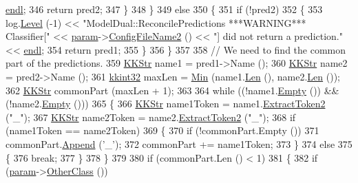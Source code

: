 \begin{DoxyCode}
      \hyperlink{namespace_k_k_b_ad1f50f65af6adc8fa9e6f62d007818a8}{endl};
346       \textcolor{keywordflow}{return} pred2;
347     \}
348   \}
349   \textcolor{keywordflow}{else}
350   \{
351     \textcolor{keywordflow}{if}  (!pred2)
352     \{
353       log.\hyperlink{class_k_k_b_1_1_run_log_a32cf761d7f2e747465fd80533fdbb659}{Level} (-1) << \textcolor{stringliteral}{"ModelDual::ReconcilePredictions  ***WARNING***  Classifier["} << 
      \hyperlink{class_k_k_m_l_l_1_1_model_dual_ac78b32cfbe102267574423e84aba9e42}{param}->\hyperlink{class_k_k_m_l_l_1_1_model_param_dual_ab8f04150ca014f0d8244b0f01a10503a}{ConfigFileName2} () << \textcolor{stringliteral}{"] did not return a prediction."} << 
      \hyperlink{namespace_k_k_b_ad1f50f65af6adc8fa9e6f62d007818a8}{endl};
354       \textcolor{keywordflow}{return}  pred1;
355     \}
356   \}
357 
358   \textcolor{comment}{// We need to find the common part of the predictions.}
359   \hyperlink{class_k_k_b_1_1_k_k_str}{KKStr}  name1 = pred1->Name ();
360   \hyperlink{class_k_k_b_1_1_k_k_str}{KKStr}  name2 = pred2->Name ();
361   \hyperlink{namespace_k_k_b_a8fa4952cc84fda1de4bec1fbdd8d5b1b}{kkint32} maxLen = \hyperlink{_raster_8cpp_a6261a282d8ed27242c636ad5fb658585}{Min} (name1.\hyperlink{class_k_k_b_1_1_k_k_str_a869142d4855517c5c237afcb25dbbe36}{Len} (), name2.\hyperlink{class_k_k_b_1_1_k_k_str_a869142d4855517c5c237afcb25dbbe36}{Len} ());
362   \hyperlink{class_k_k_b_1_1_k_k_str}{KKStr}  commonPart (maxLen + 1);
363 
364   \textcolor{keywordflow}{while}  ((!name1.\hyperlink{class_k_k_b_1_1_k_k_str_ac69942f73fffd672ec2a6e1c410afdb6}{Empty} ())  &&  (!name2.\hyperlink{class_k_k_b_1_1_k_k_str_ac69942f73fffd672ec2a6e1c410afdb6}{Empty} ()))
365   \{
366     \hyperlink{class_k_k_b_1_1_k_k_str}{KKStr}  name1Token = name1.\hyperlink{class_k_k_b_1_1_k_k_str_afe41140cee0520f0be8a3022938a1b03}{ExtractToken2} (\textcolor{stringliteral}{"\_"});
367     \hyperlink{class_k_k_b_1_1_k_k_str}{KKStr}  name2Token = name2.\hyperlink{class_k_k_b_1_1_k_k_str_afe41140cee0520f0be8a3022938a1b03}{ExtractToken2} (\textcolor{stringliteral}{"\_"});
368     \textcolor{keywordflow}{if}  (name1Token == name2Token)
369     \{
370       \textcolor{keywordflow}{if}  (!commonPart.Empty ())
371         commonPart.\hyperlink{class_k_k_b_1_1_k_k_str_ad23c5c4dccd6122f8629ce95b762f247}{Append} (\textcolor{charliteral}{'\_'});
372       commonPart += name1Token;
373     \}
374     \textcolor{keywordflow}{else}
375     \{
376       \textcolor{keywordflow}{break};
377     \}
378   \}
379 
380   \textcolor{keywordflow}{if}  (commonPart.Len () < 1)
381   \{
382     \textcolor{keywordflow}{if}  (\hyperlink{class_k_k_m_l_l_1_1_model_dual_ac78b32cfbe102267574423e84aba9e42}{param}->\hyperlink{class_k_k_m_l_l_1_1_model_param_dual_a5069c91281030811fb8563009ed0c488}{OtherClass} ())

\end{DoxyCode}
